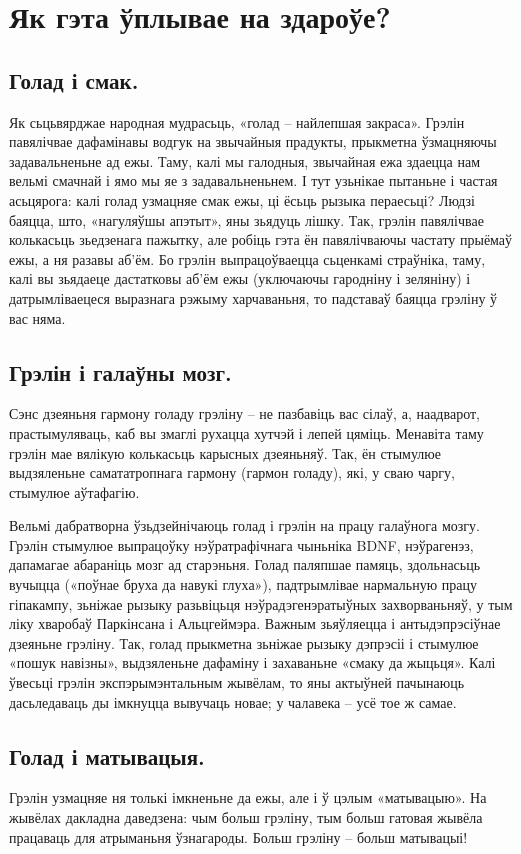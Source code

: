 \section{Як гэта ўплывае на здароўе?}

\subsection{Голад і смак.}
Як сьцьвярджае народная мудрасьць, «голад – найлепшая закраса». Грэлін павялічвае дафамінавы водгук на звычайныя прадукты, прыкметна ўзмацняючы задавальненьне ад ежы. Таму, калі мы галодныя, звычайная ежа здаецца нам вельмі смачнай і ямо мы яе з задавальненьнем. І тут узьнікае пытаньне і частая асьцярога: калі голад узмацняе смак ежы, ці ёсьць рызыка пераесьці? Людзі баяцца, што, «нагуляўшы апэтыт», яны зьядуць лішку. Так, грэлін павялічвае колькасьць зьедзенага пажытку, але робіць гэта ён павялічваючы частату прыёмаў ежы, а ня разавы аб'ём. Бо грэлін выпрацоўваецца сьценкамі страўніка, таму, калі вы зьядаеце дастатковы аб'ём ежы (уключаючы гародніну і зеляніну) і датрымліваецеся выразнага рэжыму харчаваньня, то падставаў баяцца грэліну ў вас няма.

\subsection{Грэлін і галаўны мозг.}
Сэнс дзеяньня гармону голаду грэліну – не пазбавіць вас сілаў, а, наадварот, прастымуляваць, каб вы змаглі рухацца хутчэй і лепей цяміць. Менавіта таму грэлін мае вялікую колькасьць карысных дзеяньняў. Так, ён стымулюе выдзяленьне самататропнага гармону (гармон голаду), які, у сваю чаргу, стымулюе аўтафагію.

Вельмі дабратворна ўзьдзейнічаюць голад і грэлін на працу галаўнога мозгу. Грэлін стымулюе выпрацоўку нэўратрафічнага чыньніка BDNF, нэўрагенэз, дапамагае абараніць мозг ад старэньня. Голад паляпшае памяць, здольнасьць вучыцца («поўнае бруха да навукі глуха»), падтрымлівае нармальную працу гіпакампу, зьніжае рызыку разьвіцьця нэўрадэгенэратыўных захворваньняў, у тым ліку хваробаў Паркінсана і Альцгеймэра. Важным зьяўляецца і антыдэпрэсіўнае дзеяньне грэліну. Так, голад прыкметна зьніжае рызыку дэпрэсіі і стымулюе «пошук навізны», выдзяленьне дафаміну і захаваньне «смаку да жыцьця». Калі ўвесьці грэлін экспэрымэнтальным жывёлам, то яны актыўней пачынаюць дасьледаваць ды імкнуцца вывучаць новае; у чалавека – усё тое ж самае.

\subsection{Голад і матывацыя.}
Грэлін узмацняе ня толькі імкненьне да ежы, але і ў цэлым «матывацыю». На жывёлах дакладна даведзена: чым больш грэліну, тым больш гатовая жывёла працаваць для атрыманьня ўзнагароды. Больш грэліну – больш матывацыі!

